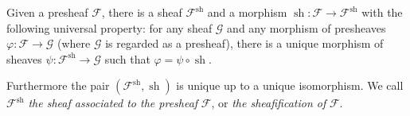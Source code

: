 \documentclass[11pt]{article}
\newcommand{\sh}{\operatorname{sh}}
\begin{document}
\begin{proposition}
    \cite[Proposition 1.2]{hartsAG}
    Given a presheaf \(\mathscr{F}\), there is a sheaf
    \(\mathscr{F}^{\sh}\) and a morphism
    \(\sh:\mathscr{F}\to\mathscr{F}^{\sh}\)
    with the following universal property: for any sheaf \(\mathscr{G}\)
    and any morphism of presheaves
    \(\varphi:\mathscr{F}\to\mathscr{G}\)
    (where \(\mathscr{G}\) is regarded as a presheaf),
    there is a unique morphism of sheaves
    \(\psi:\mathscr{F}^{\sh}\to\mathscr{G}\)
    such that \(\varphi=\psi\circ\sh\).

    \begin{center}
    \end{center}

    Furthermore the pair \((\mathscr{F}^{\sh},\sh)\)
    is unique up to a unique isomorphism.
    We call \(\mathscr{F}^{\sh}\) \emph{the sheaf associated to the presheaf}
    \(\mathscr{F}\), or \emph{the sheafification of} \(\mathscr{F}\).
\end{proposition}
\end{document}
